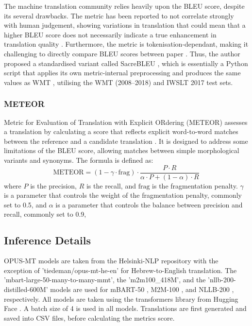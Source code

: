 \documentclass[a4paper, 11pt]{article}
\begin{document}
The machine translation community relies heavily upon the BLEU score, despite its several drawbacks. The metric has been reported to not correlate strongly with human judgement, showing variations in translation that could mean that a higher BLEU score does not necessarily indicate a true enhancement in translation quality \cite{callison-burch-2006-reevaluating-bleu}. Furthermore, the metric is tokenisation-dependant, making it challenging to directly compare BLEU scores between paper \cite{post-2018-sacrebleu}. Thus, the author proposed a standardised variant called SacreBLEU \cite{post-2018-sacrebleu}, which is essentially a Python script that applies its own metric-internal preprocessing and produces the same values as WMT \cite{barrault-2020-wmt}, utilising the WMT (2008–2018) and IWSLT 2017 \cite{cettolo-etal-2017-iwslt} test sets.

\subsubsection{METEOR}

Metric for Evaluation of Translation with Explicit ORdering (METEOR) \cite{lavie-2007-meteor} assesses a translation by calculating a score that reflects explicit word-to-word matches between the reference and a candidate translation \cite{agarwal-2008-meteor-mbleu-mter}. It is designed to address some limitations of the BLEU score, allowing matches between simple morphological variants and synonyms. The formula is defined as:
\begin{equation}
    \text{METEOR} = (1 - \gamma \cdot \text{frag}) \cdot \frac{P \cdot R}{\alpha \cdot P + (1 - \alpha) \cdot R}
\end{equation}
where \(P\) is the precision, \(R\) is the recall, and \(\text{frag}\) is the fragmentation penalty. \(\gamma\) is a parameter that controls the weight of the fragmentation penalty, commonly set to 0.5, and \(\alpha\) is a parameter that controls the balance between precision and recall, commonly set to 0.9,

\subsection{Inference Details}

OPUS-MT models are taken from the Helsinki-NLP repository with the exception of 'tiedeman/opus-mt-he-en' for Hebrew-to-English translation. The 'mbart-large-50-many-to-many-mmt', the 'm2m100\_418M', and the 'nllb-200-distilled-600M' models are used for mBART-50 \cite{liu-2020-mbart}, M2M-100 \cite{fan-2020-m2m100}, and NLLB-200 \cite{nllb200-2020}, respectively. All models are taken using the transformers \cite{wolf-etal-2020-transformers} library from Hugging Face \cite{huggingface}. A batch size of 4 is used in all models. Translations are first generated and saved into CSV files, before calculating the metrics score.
\end{document}
